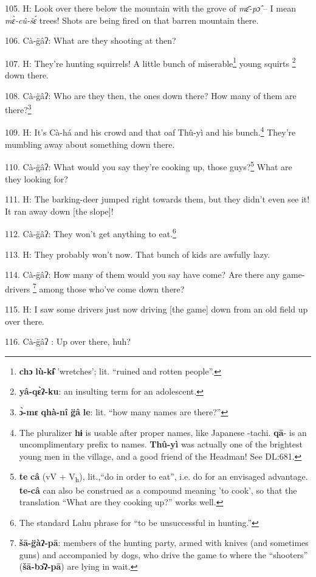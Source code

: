105. H: Look over there below the mountain with the grove of \textit{mɛ̄-pɔ̂
}-- I mean \textit{mɛ̀-cû-šɛ́} trees! Shots are being fired on that barren
mountain there.

106. Cà-g̈âʔ: What are they shooting at then?

107. H: They're hunting squirrels! A little bunch of miserable\footnote{\textbf{chɔ} \textbf{lù-kɨ̂} 'wretches'; lit. ``ruined and rotten people''.} young squirts
\footnote{\textbf{yâ-qɛ̀ʔ-ku}: an insulting term for an adolescent.} down there.

108. Cà-g̈âʔ: Who are they then, the ones down there? How many of them are
there?\footnote{\textbf{ɔ̀-mɛ} \textbf{qhà-nî} \textbf{g̈â} \textbf{le}: lit. ``how many names are there?''}

109. H: It's Cà-há and his crowd and that oaf Thû-yì and his bunch.\footnote{The pluralizer \textbf{hɨ} is usable after proper names, like Japanese -tachi. \textbf{qā}- is an uncomplimentary prefix to names. \textbf{Thû-yì} was actually one of the brightest young men in the village, and a good friend of the Headman! See DL:681.} They're
mumbling away about something down there.

110. Cà-g̈âʔ: What would you say they're cooking up, those guys?\footnote{\textbf{te} \textbf{câ} (vV + V\textsubscript{h}), lit.,``do in order to eat'', i.e. do for an envisaged advantage. \textbf{te-câ} can also be construed as a compound meaning 'to cook', so that the translation ``What are they cooking up?'' works well.} What
are they looking for?

111. H: The barking-deer jumped right towards them, but they didn't even see it!
It ran away down [the slope]!

112. Cà-g̈âʔ: They won't get anything to eat.\footnote{The standard Lahu phrase for ``to be unsuccessful in hunting.''}

113. H: They probably won't now. That bunch of kids are awfully lazy.

114. Cà-g̈âʔ: How many of them would you say have come? Are there any game-drivers
\footnote{\textbf{šā-g̈àʔ-pā}: members of the hunting party, armed with knives (and sometimes guns) and accompanied by dogs, who drive the game to where the ``shooters'' (\textbf{šā-bɔ̂ʔ-pā}) are lying in wait.} among those who've come down there?

115. H: I saw some drivers just now driving [the game] down from an old field up
over there.

116. Cà-g̈âʔ : Up over there, huh?

